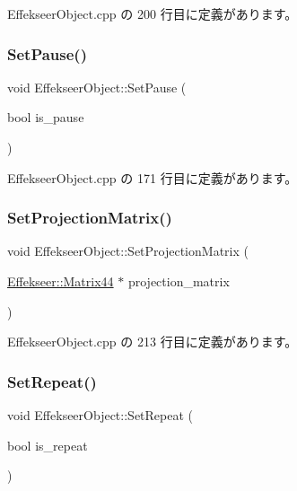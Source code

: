  Effekseer\+Object.\+cpp の 200 行目に定義があります。

\mbox{\label{class_effekseer_object_aeec933c68ceb4bafc69d65590c470d72}} 
\subsubsection{\texorpdfstring{Set\+Pause()}{SetPause()}}
{\footnotesize\ttfamily void Effekseer\+Object\+::\+Set\+Pause (\begin{DoxyParamCaption}\item[{bool}]{is\+\_\+pause }\end{DoxyParamCaption})}



 Effekseer\+Object.\+cpp の 171 行目に定義があります。

\mbox{\label{class_effekseer_object_aa3849f176ccb493b162d08c1ef387996}} 
\subsubsection{\texorpdfstring{Set\+Projection\+Matrix()}{SetProjectionMatrix()}}
{\footnotesize\ttfamily void Effekseer\+Object\+::\+Set\+Projection\+Matrix (\begin{DoxyParamCaption}\item[{\mbox{\hyperlink{struct_effekseer_1_1_matrix44}{Effekseer\+::\+Matrix44}} $\ast$}]{projection\+\_\+matrix }\end{DoxyParamCaption})}



 Effekseer\+Object.\+cpp の 213 行目に定義があります。

\mbox{\label{class_effekseer_object_a77122f2d71d44d6cceec2b6bdedb4b2a}} 
\subsubsection{\texorpdfstring{Set\+Repeat()}{SetRepeat()}}
{\footnotesize\ttfamily void Effekseer\+Object\+::\+Set\+Repeat (\begin{DoxyParamCaption}\item[{bool}]{is\+\_\+repeat }\end{DoxyParamCaption})\hspace{0.3cm}{\ttfamily [inline]}}



